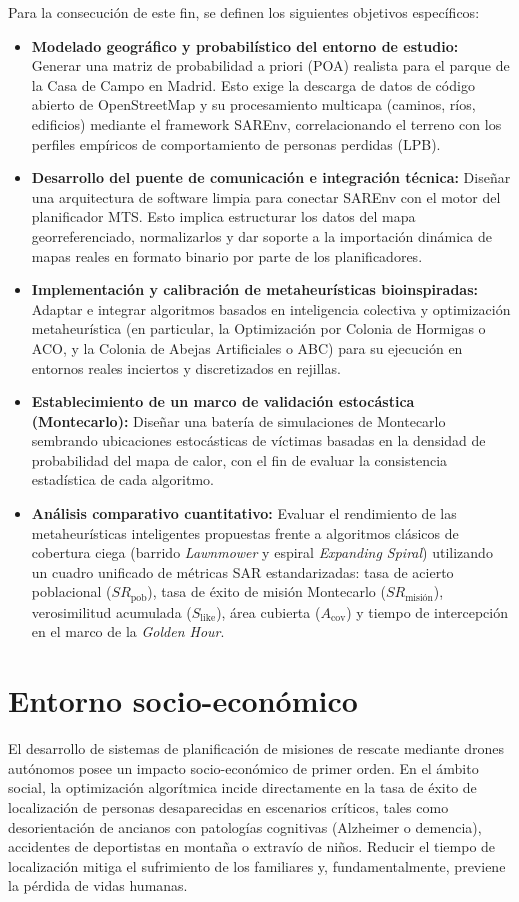 Para la consecución de este fin, se definen los siguientes objetivos específicos:
\begin{itemize}
    \item \textbf{Modelado geográfico y probabilístico del entorno de estudio:} Generar una matriz de probabilidad a priori (POA) realista para el parque de la Casa de Campo en Madrid. Esto exige la descarga de datos de código abierto de OpenStreetMap y su procesamiento multicapa (caminos, ríos, edificios) mediante el framework SAREnv, correlacionando el terreno con los perfiles empíricos de comportamiento de personas perdidas (LPB).
    \item \textbf{Desarrollo del puente de comunicación e integración técnica:} Diseñar una arquitectura de software limpia para conectar SAREnv con el motor del planificador MTS. Esto implica estructurar los datos del mapa georreferenciado, normalizarlos y dar soporte a la importación dinámica de mapas reales en formato binario por parte de los planificadores.
    \item \textbf{Implementación y calibración de metaheurísticas bioinspiradas:} Adaptar e integrar algoritmos basados en inteligencia colectiva y optimización metaheurística (en particular, la Optimización por Colonia de Hormigas o ACO, y la Colonia de Abejas Artificiales o ABC) para su ejecución en entornos reales inciertos y discretizados en rejillas.
    \item \textbf{Establecimiento de un marco de validación estocástica (Montecarlo):} Diseñar una batería de simulaciones de Montecarlo sembrando ubicaciones estocásticas de víctimas basadas en la densidad de probabilidad del mapa de calor, con el fin de evaluar la consistencia estadística de cada algoritmo.
    \item \textbf{Análisis comparativo cuantitativo:} Evaluar el rendimiento de las metaheurísticas inteligentes propuestas frente a algoritmos clásicos de cobertura ciega (barrido \textit{Lawnmower} y espiral \textit{Expanding Spiral}) utilizando un cuadro unificado de métricas SAR estandarizadas: tasa de acierto poblacional ($SR_{\text{pob}}$), tasa de éxito de misión Montecarlo ($SR_{\text{misión}}$), verosimilitud acumulada ($S_{\text{like}}$), área cubierta ($A_{\text{cov}}$) y tiempo de intercepción en el marco de la \textit{Golden Hour}.
\end{itemize}

\section{Entorno socio-económico}
El desarrollo de sistemas de planificación de misiones de rescate mediante drones autónomos posee un impacto socio-económico de primer orden. En el ámbito social, la optimización algorítmica incide directamente en la tasa de éxito de localización de personas desaparecidas en escenarios críticos, tales como desorientación de ancianos con patologías cognitivas (Alzheimer o demencia), accidentes de deportistas en montaña o extravío de niños. Reducir el tiempo de localización mitiga el sufrimiento de los familiares y, fundamentalmente, previene la pérdida de vidas humanas.

